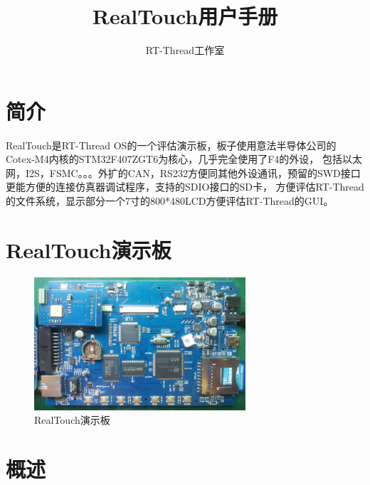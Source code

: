 \documentclass[titlepage]{article}
\author{RT-Thread工作室}
\title{RealTouch用户手册}
\begin{document}
\maketitle
 \renewcommand{\contentsname}{目录}
 \tableofcontents
 \newpage
 \section{简介}
RealTouch是RT-Thread OS的一个评估演示板，板子使用意法半导体公司的Cotex-M4内核的STM32F407ZGT6为核心，几乎完全使用了F4的外设，
包括以太网，I2S，FSMC。。。外扩的CAN，RS232方便同其他外设通讯，预留的SWD接口更能方便的连接仿真器调试程序，支持的SDIO接口的SD卡，
方便评估RT-Thread的文件系统，显示部分一个7寸的800*480LCD方便评估RT-Thread的GUI。
\newpage
\section{RealTouch演示板}
\begin{figure}[h]
 \centering
 \includegraphics[width=0.7\textwidth]{board_d.jpg}
 \caption{RealTouch演示板}
 \end{figure}
\newpage
\section{概述}
\end{document}
